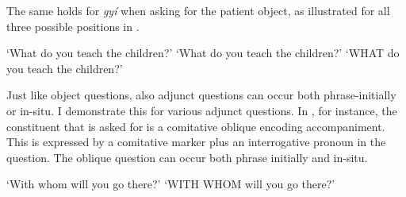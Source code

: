 \noindent The same holds for {\itshape gyí} when asking for the patient object, as illustrated for all three possible positions in .

\ea\label{QDO}
    \trans `What do you teach the children?'
    \trans `What do you teach the children?'
    \trans `WHAT do you teach the children?'
\z
\z



Just like object questions, also adjunct questions can occur both phrase-ini\-tial\-ly or in-situ. I demonstrate this for various adjunct questions.
In , for instance, the constituent that is asked for is a comitative oblique encoding accompaniment. This is expressed by a comitative marker plus an interrogative pronoun in the question. The oblique question can occur both phrase initially and in-situ.

\ea\label{AQ1}
    \trans `With whom will you go there?'
       \trans `WITH WHOM will you go there?'
\z
\z



